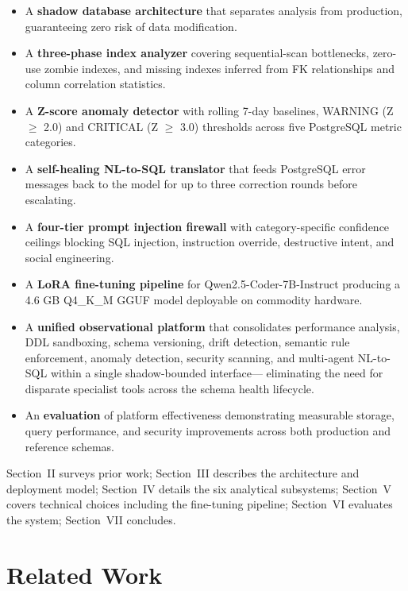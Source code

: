 \documentclass[conference]{IEEEtran}
\begin{document}
\begin{itemize}
    \item A \textbf{shadow database architecture} that separates analysis
    from production, guaranteeing zero risk of data modification.
    \item A \textbf{three-phase index analyzer} covering sequential-scan
    bottlenecks, zero-use zombie indexes, and missing indexes inferred from
    FK relationships and column correlation statistics.
    \item A \textbf{Z-score anomaly detector} with rolling 7-day baselines,
    WARNING (Z $\geq$ 2.0) and CRITICAL (Z $\geq$ 3.0) thresholds across
    five PostgreSQL metric categories.
    \item A \textbf{self-healing NL-to-SQL translator} that feeds
    PostgreSQL error messages back to the model for up to three correction
    rounds before escalating.
    \item A \textbf{four-tier prompt injection firewall} with
    category-specific confidence ceilings blocking SQL injection,
    instruction override, destructive intent, and social engineering.
    \item A \textbf{LoRA fine-tuning pipeline} for Qwen2.5-Coder-7B-Instruct
    producing a 4.6 GB Q4\_K\_M GGUF model deployable on commodity hardware.
    \item A \textbf{unified observational platform} that consolidates
    performance analysis, DDL sandboxing, schema versioning, drift detection,
    semantic rule enforcement, anomaly detection, security scanning, and
    multi-agent NL-to-SQL within a single shadow-bounded interface---
    eliminating the need for disparate specialist tools across the schema
    health lifecycle.
    \item An \textbf{evaluation} of platform effectiveness demonstrating
    measurable storage, query performance, and security improvements across
    both production and reference schemas.
\end{itemize}

Section~II surveys prior work; Section~III describes the architecture
and deployment model; Section~IV details the six analytical subsystems;
Section~V covers technical choices including the fine-tuning pipeline;
Section~VI evaluates the system; Section~VII concludes.

\section{Related Work}
\end{document}
